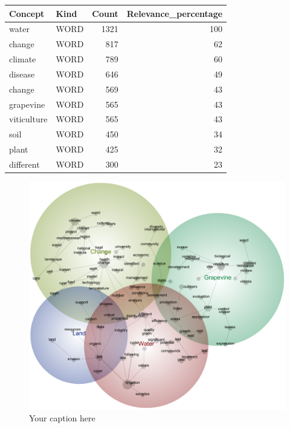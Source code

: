 \begin{table}[h]\label{tab:lexi}
    \begin{tabular}{@{}llrr@{}}
    \toprule
    \textbf{Concept} & \textbf{Kind} & \multicolumn{1}{l}{\textbf{Count}} & \multicolumn{1}{l}{\textbf{Relevance_percentage}} \\ \midrule
    water & WORD & 1321 & 100 \\
    change & WORD & 817 & 62 \\
    climate & WORD & 789 & 60 \\
    disease & WORD & 646 & 49 \\
    change & WORD & 569 & 43 \\
    grapevine & WORD & 565 & 43 \\
    viticulture & WORD & 565 & 43 \\
    soil & WORD & 450 & 34 \\
    plant & WORD & 425 & 32 \\
    different & WORD & 300 & 23 \\ \bottomrule
    \end{tabular}
    \end{table}

\begin{figure}[h]
    \centering
    \includegraphics[width=\linewidth]{Winegrowing-concept-map}
    \caption{Your caption here}
    \label{fig:lexi}
\end{figure}

